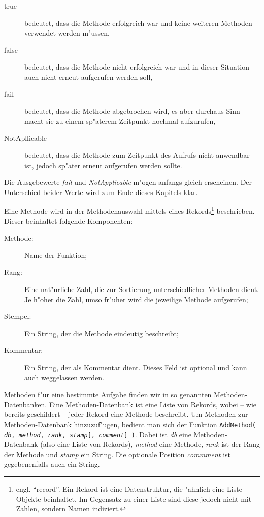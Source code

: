 \documentclass[a4paper,11pt]{article}
\theoremstyle{bla}
\begin{document}
\begin{description}
 \item[true] bedeutet, dass die Methode erfolgreich war und keine weiteren Methoden verwendet werden m"ussen,
 \item[false] bedeutet, dass die Methode nicht erfolgreich war und in dieser Situation auch nicht erneut aufgerufen werden soll,
 \item[fail] bedeutet, dass die Methode abgebrochen wird, es aber durchaus Sinn macht sie zu einem sp"aterem Zeitpunkt nochmal aufzurufen,
 \item[NotApllicable] bedeutet, dass die Methode zum Zeitpunkt des Aufrufs nicht anwendbar ist, jedoch sp"ater erneut aufgerufen werden sollte.
 \end{description}

Die Ausgebewerte \textit{fail} und \textit{NotApplicable} m"ogen anfangs gleich erscheinen. Der Unterschied beider Werte wird zum Ende dieses Kapitels klar.

Eine Methode wird in der Methodenauswahl mittels eines Rekords\footnote{engl. "`record"'. Ein Rekord ist eine Datenstruktur, die "ahnlich eine Liste Objekte beinhaltet. Im Gegensatz zu einer Liste sind diese jedoch nicht mit Zahlen, sondern Namen indiziert.} beschrieben. Dieser beinhaltet folgende Komponenten:

\begin{description}
 \item[Methode:] Name der Funktion;
 \item[Rang:] Eine nat"urliche Zahl, die zur Sortierung unterschiedlicher Methoden dient. Je h"oher die Zahl, umso fr"uher wird die jeweilige Methode aufgerufen;
 \item[Stempel:] Ein String, der die Methode eindeutig beschreibt;
 \item[Kommentar:] Ein String, der als Kommentar dient. Dieses Feld ist optional und kann auch weggelassen werden.
 \end{description}

Methoden f"ur eine bestimmte Aufgabe finden wir in so genannten Methoden-Datenbanken. Eine Methoden-Datenbank ist eine Liste von Rekords, wobei -- wie bereits geschildert -- jeder Rekord eine Methode beschreibt.
Um Methoden zur Methoden-Datenbank hinzuzuf"ugen, bedient man sich der Funktion
\texttt{AddMethod( \textit{db}, \textit{method}, \textit{rank}, \textit{stamp}[, \textit{comment}] )}. Dabei ist \textit{db} eine Methoden-Datenbank (also eine Liste von Rekords), \textit{method} eine Methode, \textit{rank} ist der Rang der Methode und \textit{stamp} ein String. Die optionale Position \textit{commment} ist gegebenenfalls auch ein String.
\end{document}
